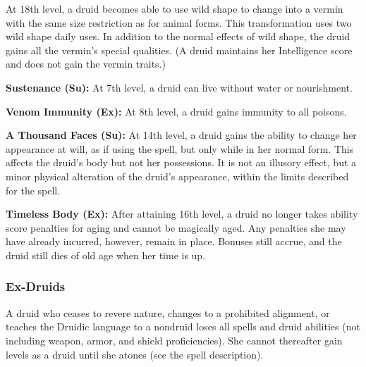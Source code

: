 At 18th level, a druid becomes able to use wild shape to change into a vermin with the same size restriction as for animal forms. This transformation uses two wild shape daily uses. In addition to the normal effects of wild shape, the druid gains all the vermin's special qualities. (A druid maintains her Intelligence score and does not gain the vermin traits.)



\textbf{Sustenance (Su):} At 7th level, a druid can live without water or nourishment.

\textbf{Venom Immunity (Ex):} At 8th level, a druid gains immunity to all poisons.

\textbf{A Thousand Faces (Su):} At 14th level, a druid gains the ability to change her appearance at will, as if using the  spell, but only while in her normal form. This affects the druid's body but not her possessions. It is not an illusory effect, but a minor physical alteration of the druid's appearance, within the limits described for the spell.

\textbf{Timeless Body (Ex):} After attaining 16th level, a druid no longer takes ability score penalties for aging and cannot be magically aged. Any penalties she may have already incurred, however, remain in place. Bonuses still accrue, and the druid still dies of old age when her time is up.

\subsubsection{Ex-Druids}
A druid who ceases to revere nature, changes to a prohibited alignment, or teaches the Druidic language to a nondruid loses all spells and druid abilities (not including weapon, armor, and shield proficiencies). She cannot thereafter gain levels as a druid until she atones (see the  spell description).

